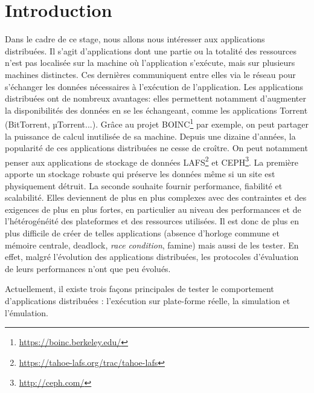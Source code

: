\section{Introduction}



Dans le cadre de ce stage, nous allons nous intéresser aux applications
distribuées. Il s'agit d'applications dont une partie ou la totalité des
ressources n'est pas localisée sur la machine où l'application s'exécute, mais
sur plusieurs machines distinctes. Ces dernières communiquent entre elles via le
réseau pour s'échanger les données nécessaires à l'exécution de
l'application. Les applications distribuées ont de nombreux avantages: elles
permettent notamment d'augmenter la disponibilités des données en se les
échangeant, comme les applications Torrent (BitTorrent, $µ$Torrent...). Grâce au
projet BOINC\footnote{\url{https://boinc.berkeley.edu/}} par exemple, on peut
partager la puissance de calcul inutilisée de sa machine. Depuis une dizaine
d'années, la popularité de ces applications distribuées ne cesse de croître. On
peut notamment penser aux applications de stockage de données
LAFS\footnote{\url{https://tahoe-lafs.org/trac/tahoe-lafs}} et
CEPH\footnote{\url{http://ceph.com/}}. La première apporte un stockage robuste
qui préserve les données même si un site est physiquement détruit. La seconde
souhaite fournir performance, fiabilité et scalabilité.  Elles deviennent de
plus en plus complexes avec des contraintes et des exigences de plus en plus
fortes, en particulier au niveau des performances et de l'hétérogénéité des
plateformes et des ressources utilisées. Il est donc de plus en plus
difficile de créer de telles applications (absence d'horloge commune et mémoire
centrale, deadlock, \textit{race condition}, famine) mais aussi de les tester.  En effet, malgré
l'évolution des applications distribuées, les protocoles d'évaluation de leurs
performances n'ont que peu évolués.
\newline

Actuellement, il existe trois façons principales de tester le comportement
d'applications distribuées \citep{gustedt2009experimental}: l'exécution sur
plate-forme réelle, la simulation et l'émulation.

